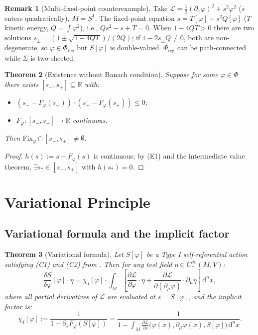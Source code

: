 \documentclass[12pt,letterpaper]{article}
\newtheorem{theorem}{Theorem}[section]
\theoremstyle{definition}
\newtheorem{remark}[theorem]{Remark}
\newcommand{\mL}{\mathcal{L}}
\newcommand{\mPhi}{\Phi}
\newcommand{\mreg}{\mPhi_{\mathrm{reg}}}
\newcommand{\Fix}{\mathrm{Fix}}
\newcommand{\R}{\mathbb{R}}
\newcommand{\diff}{\mathrm{d}}
\newcommand{\dVol}{\,\diff^n x}
\begin{document}
\begin{remark}[Multi-fixed-point counterexample]
\label{rem:multi-fixed-point}
Take $\mL = \frac{1}{2}(\partial_x\varphi)^2 + s^2\varphi^2$ ($s$ enters quadratically), $M = S^1$. The fixed-point equation $s = T[\varphi] + s^2 Q[\varphi]$ ($T$ kinetic energy, $Q = \int\varphi^2$), i.e., $Q s^2 - s + T = 0$. When $1 - 4QT > 0$ there are two solutions $s_\pm = (1 \pm \sqrt{1-4QT})/(2Q)$; if $1 - 2s_\pm Q \neq 0$, both are non-degenerate, so $\varphi \in \mreg$ but $S[\varphi]$ is double-valued. $\Phi_{\mathrm{reg}}$ can be path-connected while $\Sigma$ is two-sheeted.
\end{remark}

\begin{theorem}[Existence without Banach condition]
\label{thm:p2}
Suppose for some $\varphi \in \mPhi$ there exists $[s_-, s_+] \subseteq \R$ with:
\begin{itemize}
\item[(E1)] $(s_- - F_\varphi(s_-)) \cdot (s_+ - F_\varphi(s_+)) \leq 0$;
\item[(E2)] $F_\varphi: [s_-, s_+] \to \R$ continuous.
\end{itemize}
Then $\Fix_\varphi \cap [s_-, s_+] \neq \emptyset$.
\end{theorem}

\begin{proof}
$h(s) := s - F_\varphi(s)$ is continuous; by (E1) and the intermediate value theorem, $\exists s_* \in [s_-, s_+]$ with $h(s_*) = 0$.
\end{proof}

\section{Variational Principle}
\label{sec:variational}

\subsection{Variational formula and the implicit factor}

\begin{theorem}[Variational formula]
\label{thm:var-formula}
Let $S[\varphi]$ be a Type I self-referential action satisfying (C1) and (C2) from . Then for any test field $\eta \in C_c^\infty(M, V)$:
\begin{equation}
\frac{\delta S}{\delta \varphi}[\varphi] \cdot \eta = \chi_I[\varphi] \cdot \int_M \left[\frac{\partial \mL}{\partial \varphi} \cdot \eta + \frac{\partial \mL}{\partial(\partial_\mu \varphi)} \cdot \partial_\mu \eta\right] \dVol,
\label{eq:var-formula}
\end{equation}
where all partial derivatives of $\mL$ are evaluated at $s = S[\varphi]$, and the \emph{implicit factor} is:
\begin{equation}
\chi_I[\varphi] := \frac{1}{1 - \partial_s F_\varphi(S[\varphi])} = \frac{1}{1 - \int_M \frac{\partial \mL}{\partial s}\bigl(\varphi(x), \partial_\mu\varphi(x), S[\varphi]\bigr) \dVol}.
\label{eq:implicit-factor}
\end{equation}
\end{theorem}
\end{document}
